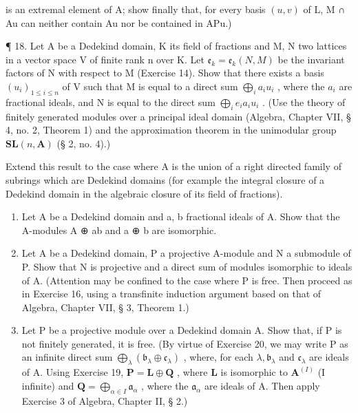 is an extremal element of A; show finally that, for every basis \((u, v)\) of L, M ∩ Au can neither contain Au nor be contained in APu.)

¶ 18. Let A be a Dedekind domain, K its field of fractions and M, N two lattices in a vector space V of finite rank n over K. Let \(\mathfrak{e}_{k} = \mathfrak{e}_{k}(N, M)\) be the invariant factors of N with respect to M (Exercise 14). Show that there exists a basis \((u_{i})_{1 \leqslant i \leqslant n}\) of V such that M is equal to a direct sum \(\bigoplus_{i} a_{i} u_{i}\) , where the \(a_{i}\) are fractional ideals, and N is equal to the direct sum \(\bigoplus_{i} e_{i} a_{i} u_{i}\) . (Use the theory of finitely generated modules over a principal ideal domain (Algebra, Chapter VII, § 4, no. 2, Theorem 1) and the approximation theorem in the unimodular group \(\mathbf{SL}(n, \mathbf{A})\) (§ 2, no. 4).)

Extend this result to the case where A is the union of a right directed family of subrings which are Dedekind domains (for example the integral closure of a Dedekind domain in the algebraic closure of its field of fractions).

\begin{enumerate}
\def\labelenumi{\arabic{enumi}.}
\setcounter{enumi}{18}
\item
  Let A be a Dedekind domain and a, b fractional ideals of A. Show that the A-modules A ⊕ ab and a ⊕ b are isomorphic.
\item
  Let A be a Dedekind domain, P a projective A-module and N a submodule of P. Show that N is projective and a direct sum of modules isomorphic to ideals of A. (Attention may be confined to the case where P is free. Then proceed as in Exercise 16, using a transfinite induction argument based on that of Algebra, Chapter VII, § 3, Theorem 1.)
\item
  Let P be a projective module over a Dedekind domain A. Show that, if P is not finitely generated, it is free. (By virtue of Exercise 20, we may write P as an infinite direct sum \(\bigoplus_{\lambda} (\mathfrak{b}_{\lambda} \oplus \mathfrak{c}_{\lambda})\) , where, for each \(\lambda, \mathfrak{b}_{\lambda}\) and \(\mathfrak{c}_{\lambda}\) are ideals of A. Using Exercise 19, \(\mathbf{P} = \mathbf{L} \oplus \mathbf{Q}\) , where \(\mathbf{L}\) is isomorphic to \(\mathbf{A}^{(I)}\) (I infinite) and \(\mathbf{Q} = \bigoplus_{\alpha \in I} \mathfrak{a}_{\alpha}\) , where the \(\mathfrak{a}_{\alpha}\) are ideals of A. Then apply Exercise 3 of Algebra, Chapter II, § 2.)
\end{enumerate}


